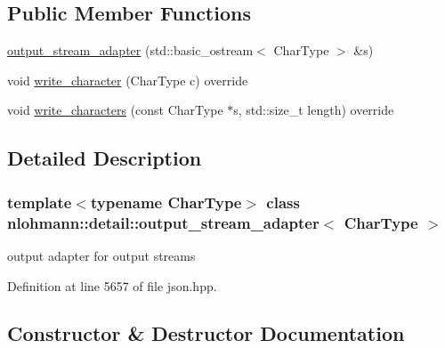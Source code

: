 \subsection*{Public Member Functions}
\begin{DoxyCompactItemize}
\item 
\hyperlink{classnlohmann_1_1detail_1_1output__stream__adapter_a4e78a9bd19cbf3a4191adc62d14f0055}{output\+\_\+stream\+\_\+adapter} (std\+::basic\+\_\+ostream$<$ Char\+Type $>$ \&s)
\item 
void \hyperlink{classnlohmann_1_1detail_1_1output__stream__adapter_a6e2698c76b200b2d8fac6cebfc43a245}{write\+\_\+character} (Char\+Type c) override
\item 
void \hyperlink{classnlohmann_1_1detail_1_1output__stream__adapter_ad61375497a7d03cb0bdcddfdaad185d0}{write\+\_\+characters} (const Char\+Type $\ast$s, std\+::size\+\_\+t length) override
\end{DoxyCompactItemize}


\subsection{Detailed Description}
\subsubsection*{template$<$typename Char\+Type$>$\newline
class nlohmann\+::detail\+::output\+\_\+stream\+\_\+adapter$<$ Char\+Type $>$}

output adapter for output streams 

Definition at line 5657 of file json.\+hpp.



\subsection{Constructor \& Destructor Documentation}
\mbox{\label{classnlohmann_1_1detail_1_1output__stream__adapter_a4e78a9bd19cbf3a4191adc62d14f0055}} 
